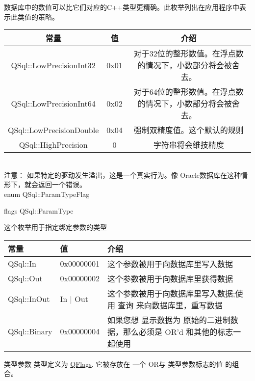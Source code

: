 数据库中的数值可以比它们对应的C++类型更精确。此枚举列出在应用程序中表示此类值的策略。


\begin{tabular}{|c|c|c|}
	\hline
	常量	& 值 & 介绍 \\
	\hline
	QSql::LowPrecisionInt32	&0x01 &对于32位的整形数值。在浮点数的情况下，小数部分将会被舍去。\\
	\hline
	QSql::LowPrecisionInt64	&0x02 &对于64位的整形数值。在浮点数的情况下，小数部分将会被舍去。\\
	\hline
	QSql::LowPrecisionDouble&0x04 &强制双精度值。这个默认的规则\\
	\hline
	QSql::HighPrecision	&0&字符串将会维技精度\\
	\hline
\end{tabular}\\

注意： 如果特定的驱动发生溢出，这是一个真实行为。像 Oracle数据库在这种情形下，就会返回一个错误。\\


enum QSql::ParamTypeFlag


flags QSql::ParamType


这个枚举用于指定绑定参数的类型

\begin{tabular}{|l|l|l|}
	\hline
	常量	& 值 & 介绍 \\
	\hline
	QSql::In&0x00000001&这个参数被用于向数据库里写入数据\\
	\hline
	QSql::Out&0x00000002&这个参数被用于向数据库里获得数据\\
	\hline
	QSql::InOut&In | Out&这个参数被用于向数据库里写入数据;使用 查询 来向数据库里，重写数据\\
	\hline
	QSql::Binary&0x00000004&如果您想 显示数据为 原始的二进制数据，那么必须是 OR'd 和其他的标志一 起使用\\
	\hline
\end{tabular}

类型参数 类型定义为 \href{https://doc.qt.io/qt-5/qflags.html}{QFlags}. 它被存放在 一个 OR与 类型参数标志的值 的组合。






